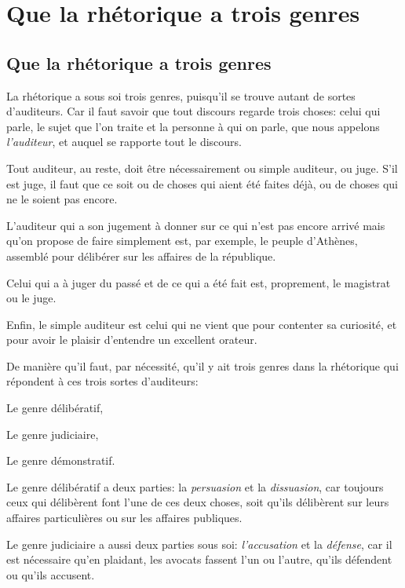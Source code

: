 
\section{Que la rhétorique a trois genres}


\subsection{Que la rhétorique a trois genres}

La rhétorique a sous soi trois genres, puisqu'il se trouve autant de sortes d'auditeurs. Car il faut savoir que
tout discours regarde trois choses: celui qui parle, le sujet que l'on traite et la personne à qui on parle, que
nous appelons \emph{l'auditeur}, et auquel se rapporte tout le discours. 

Tout auditeur, au reste, doit être nécessairement ou simple auditeur, ou juge. S'il est juge, il faut que ce soit
ou de choses qui aient été faites déjà, ou de choses qui ne le soient pas encore.

L'auditeur qui a son jugement à donner sur ce qui n'est pas encore arrivé mais qu'on propose de faire simplement
est, par exemple, le peuple d'Athènes, assemblé pour délibérer sur les affaires de la république.

Celui qui a à juger du passé et de ce qui a été fait est, proprement, le magistrat ou le juge.

Enfin, le simple auditeur est celui qui ne vient que pour contenter sa curiosité, et pour avoir le plaisir d'entendre
un excellent orateur.

De manière qu'il faut, par nécessité, qu'il y ait trois genres dans la rhétorique qui répondent à ces trois sortes
d'auditeurs:

\begin{emphpar}
Le genre délibératif,

Le genre judiciaire,

Le genre démonstratif.
\end{emphpar}

Le genre délibératif a deux parties: la \emph{persuasion} et la \emph{dissuasion}, car toujours ceux qui délibèrent font
l'une de ces deux choses, soit qu'ils délibèrent sur leurs affaires particulières ou sur les affaires publiques.

Le genre judiciaire a aussi deux parties sous soi: \emph{l'accusation} et la \emph{défense}, car il est nécessaire qu'en
plaidant, les avocats fassent l'un ou l'autre, qu'ils défendent ou qu'ils accusent.

